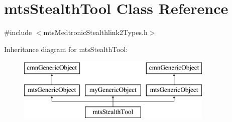 \hypertarget{classmts_stealth_tool}{}\section{mts\+Stealth\+Tool Class Reference}
\label{classmts_stealth_tool}


{\ttfamily \#include $<$mts\+Medtronic\+Stealthlink2\+Types.\+h$>$}

Inheritance diagram for mts\+Stealth\+Tool\+:\begin{figure}[H]
\begin{center}
\leavevmode
\includegraphics[height=3.000000cm]{d3/dae/classmts_stealth_tool}
\end{center}
\end{figure}
